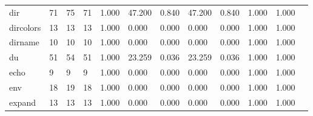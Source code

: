 \begin{longtable}{lp{1.00cm}p{1.00cm}p{1.00cm}p{1.00cm}p{1.00cm}p{1.00cm}p{1.00cm}p{1.00cm}p{1.00cm}p{1.00cm}p{1.00cm}}
dir       &                           71 &                 75 &                                71 &                                      1.000 &                                 47.200 &                                        0.840 &                            47.200 &                                   0.840 &                        1.000 &                                        1.000 \\
dircolors &                           13 &                 13 &                                13 &                                      1.000 &                                  0.000 &                                        0.000 &                             0.000 &                                   0.000 &                        1.000 &                                        1.000 \\
dirname   &                           10 &                 10 &                                10 &                                      1.000 &                                  0.000 &                                        0.000 &                             0.000 &                                   0.000 &                        1.000 &                                        1.000 \\
du        &                           51 &                 54 &                                51 &                                      1.000 &                                 23.259 &                                        0.036 &                            23.259 &                                   0.036 &                        1.000 &                                        1.000 \\
echo      &                            9 &                  9 &                                 9 &                                      1.000 &                                  0.000 &                                        0.000 &                             0.000 &                                   0.000 &                        1.000 &                                        1.000 \\
env       &                           18 &                 19 &                                18 &                                      1.000 &                                  0.000 &                                        0.000 &                             0.000 &                                   0.000 &                        1.000 &                                        1.000 \\
expand    &                           13 &                 13 &                                13 &                                      1.000 &                                  0.000 &                                        0.000 &                             0.000 &                                   0.000 &                        1.000 &                                        1.000 \\

\end{longtable}
